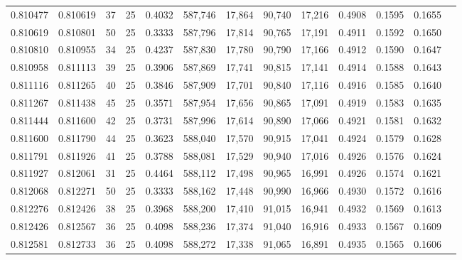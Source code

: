 \begin{tabular}{rrrrrrrrrrrrr}
0.810477 & 0.810619 &    37 &  25 &                                     0.4032 & 587,746 &  17,864 &  90,740 &  17,216 & 0.4908 & 0.1595 & 0.1655 \\
0.810619 & 0.810801 &    50 &  25 &                                     0.3333 & 587,796 &  17,814 &  90,765 &  17,191 & 0.4911 & 0.1592 & 0.1650 \\
0.810810 & 0.810955 &    34 &  25 &                                     0.4237 & 587,830 &  17,780 &  90,790 &  17,166 & 0.4912 & 0.1590 & 0.1647 \\
0.810958 & 0.811113 &    39 &  25 &                                     0.3906 & 587,869 &  17,741 &  90,815 &  17,141 & 0.4914 & 0.1588 & 0.1643 \\
0.811116 & 0.811265 &    40 &  25 &                                     0.3846 & 587,909 &  17,701 &  90,840 &  17,116 & 0.4916 & 0.1585 & 0.1640 \\
0.811267 & 0.811438 &    45 &  25 &                                     0.3571 & 587,954 &  17,656 &  90,865 &  17,091 & 0.4919 & 0.1583 & 0.1635 \\
0.811444 & 0.811600 &    42 &  25 &                                     0.3731 & 587,996 &  17,614 &  90,890 &  17,066 & 0.4921 & 0.1581 & 0.1632 \\
0.811600 & 0.811790 &    44 &  25 &                                     0.3623 & 588,040 &  17,570 &  90,915 &  17,041 & 0.4924 & 0.1579 & 0.1628 \\
0.811791 & 0.811926 &    41 &  25 &                                     0.3788 & 588,081 &  17,529 &  90,940 &  17,016 & 0.4926 & 0.1576 & 0.1624 \\
0.811927 & 0.812061 &    31 &  25 &                                     0.4464 & 588,112 &  17,498 &  90,965 &  16,991 & 0.4926 & 0.1574 & 0.1621 \\
0.812068 & 0.812271 &    50 &  25 &                                     0.3333 & 588,162 &  17,448 &  90,990 &  16,966 & 0.4930 & 0.1572 & 0.1616 \\
0.812276 & 0.812426 &    38 &  25 &                                     0.3968 & 588,200 &  17,410 &  91,015 &  16,941 & 0.4932 & 0.1569 & 0.1613 \\
0.812426 & 0.812567 &    36 &  25 &                                     0.4098 & 588,236 &  17,374 &  91,040 &  16,916 & 0.4933 & 0.1567 & 0.1609 \\
0.812581 & 0.812733 &    36 &  25 &                                     0.4098 & 588,272 &  17,338 &  91,065 &  16,891 & 0.4935 & 0.1565 & 0.1606 \\

\end{tabular}
